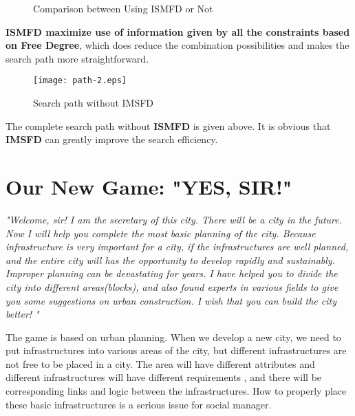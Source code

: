 \documentclass{mcmthesis}
\begin{document}
				\begin{figure}[htbp]
					\centering
					\centering
					\caption{Comparison between Using ISMFD or Not}
				\end{figure}
				
				\textbf{ISMFD maximize use of information given by all the constraints based on Free Degree}, which does reduce the combination possibilities and makes the search path more straightforward.
				
				
			
				\begin{figure}[h]
					\small
					\centering
					\texttt{[image: path-2.eps]}
					\caption{Search path without IMSFD} 
					\label{fig:path-2}
				\end{figure}
			
				The complete search path without \textbf{ISMFD} is given above. It is obvious that \textbf{IMSFD} can greatly improve the search efficiency.	
				
				
	\clearpage
	\section{Our New Game: "YES, SIR!"}
	
		\emph{"Welcome, sir! I am the secretary of this city. There will be a city in the future. Now I will help you complete the most basic planning of the city. Because infrastructure is very important for a city, if the infrastructures are well planned, and the entire city will has the opportunity to develop rapidly and sustainably. Improper planning can be devastating for years. I have helped you to divide the city into different areas(blocks), and also found experts in various fields to give you some suggestions on urban construction. I wish that you can build the city better! "}
	
		The game is based on urban planning. When we develop a new city, we need to put infrastructures into various areas of the city, but different infrastructures are not free to be placed in a city. The area will have different attributes and different infrastructures will have different requirements , and there will be corresponding links and logic between the infrastructures. How to properly place these basic infrastructures is a serious issue for social manager.
		
\end{document}
